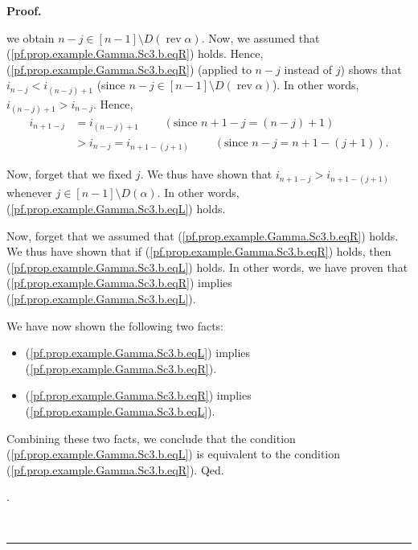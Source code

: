\documentclass[numbers=enddot,12pt,final,onecolumn,notitlepage,abstracton]{scrartcl}
\theoremstyle{definition}
\newenvironment{proof}[1][Proof]{\noindent\textbf{#1.} }{\ \rule{0.5em}{0.5em}}
\newenvironment{verlong}{}{}
\begin{document}
\begin{verlong}
\begin{footnotesize}
\begin{proof}
{we obtain $n-j\in\left[  n-1\right]  \setminus D\left(  \operatorname*{rev}%
\alpha\right)  $. Now, we assumed that (\ref{pf.prop.example.Gamma.Sc3.b.eqR})
holds. Hence, (\ref{pf.prop.example.Gamma.Sc3.b.eqR}) (applied to $n-j$
instead of $j$) shows that $i_{n-j}<i_{\left(  n-j\right)  +1}$ (since
$n-j\in\left[  n-1\right]  \setminus D\left(  \operatorname*{rev}%
\alpha\right)  $). In other words, $i_{\left(  n-j\right)  +1}>i_{n-j}$.
Hence,%
\begin{align*}
i_{n+1-j}  &  =i_{\left(  n-j\right)  +1}\ \ \ \ \ \ \ \ \ \ \left(
\text{since }n+1-j=\left(  n-j\right)  +1\right) \\
&  >i_{n-j}=i_{n+1-\left(  j+1\right)  }\ \ \ \ \ \ \ \ \ \ \left(
\text{since }n-j=n+1-\left(  j+1\right)  \right)  .
\end{align*}
\par
Now, forget that we fixed $j$. We thus have shown that $i_{n+1-j}%
>i_{n+1-\left(  j+1\right)  }$ whenever $j\in\left[  n-1\right]  \setminus
D\left(  \alpha\right)  $. In other words,
(\ref{pf.prop.example.Gamma.Sc3.b.eqL}) holds.
\par
Now, forget that we assumed that (\ref{pf.prop.example.Gamma.Sc3.b.eqR})
holds. We thus have shown that if (\ref{pf.prop.example.Gamma.Sc3.b.eqR})
holds, then (\ref{pf.prop.example.Gamma.Sc3.b.eqL}) holds. In other words, we
have proven that (\ref{pf.prop.example.Gamma.Sc3.b.eqR}) implies
(\ref{pf.prop.example.Gamma.Sc3.b.eqL}).
\par
We have now shown the following two facts:
\par
\begin{itemize}
\item (\ref{pf.prop.example.Gamma.Sc3.b.eqL}) implies
(\ref{pf.prop.example.Gamma.Sc3.b.eqR}).
\par
\item (\ref{pf.prop.example.Gamma.Sc3.b.eqR}) implies
(\ref{pf.prop.example.Gamma.Sc3.b.eqL}).
\end{itemize}
\par
Combining these two facts, we conclude that the condition
(\ref{pf.prop.example.Gamma.Sc3.b.eqL}) is equivalent to the condition
(\ref{pf.prop.example.Gamma.Sc3.b.eqR}). Qed.}.


\end{proof}
\end{footnotesize}
\end{verlong}
\end{document}
